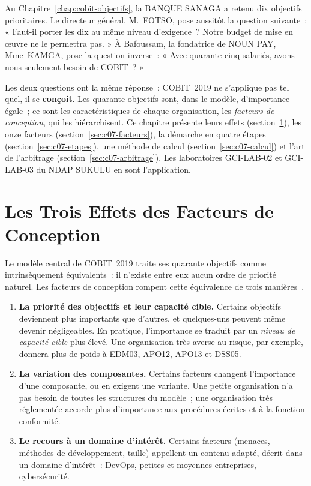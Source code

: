 Au Chapitre~\ref{chap:cobit-objectifs}, la BANQUE SANAGA a retenu dix
objectifs prioritaires. Le directeur général, M.~FOTSO, pose aussitôt la
question suivante~: « Faut-il porter les dix au même niveau d'exigence~?
Notre budget de mise en œuvre ne le permettra pas. » À Bafoussam, la
fondatrice de NOUN PAY, Mme~KAMGA, pose la question inverse~: « Avec
quarante-cinq salariés, avons-nous seulement besoin de COBIT~? »

Les deux questions ont la même réponse~: COBIT~2019 ne s'applique pas
tel quel, il se \textbf{conçoit}. Les quarante objectifs sont, dans le
modèle, d'importance égale~; ce sont les caractéristiques de chaque
organisation, les \emph{facteurs de conception}, qui les hiérarchisent.
Ce chapitre présente leurs effets (section~\ref{sec:c07-effets}), les
onze facteurs (section~\ref{sec:c07-facteurs}), la démarche en quatre
étapes (section~\ref{sec:c07-etapes}), une méthode de calcul
(section~\ref{sec:c07-calcul}) et l'art de l'arbitrage
(section~\ref{sec:c07-arbitrage}). Les laboratoires GCI-LAB-02 et GCI-LAB-03 du
NDAP SUKULU en sont l'application.

\separateur

\section{Les Trois Effets des Facteurs de Conception}
\label{sec:c07-effets}

Le modèle central de COBIT~2019 traite ses quarante objectifs comme
intrinsèquement équivalents~: il n'existe entre eux aucun ordre de priorité
naturel. Les facteurs de conception rompent cette équivalence de trois
manières~\cite{isaca2018cobitintro}.

\begin{enumerate}
    \item \textbf{La priorité des objectifs et leur capacité cible.} Certains
          objectifs deviennent plus importants que d'autres, et quelques-uns
          peuvent même devenir négligeables. En pratique, l'importance se
          traduit par un \emph{niveau de capacité cible} plus élevé. Une
          organisation très averse au risque, par exemple, donnera plus de
          poids à EDM03, APO12, APO13 et DSS05.
    \item \textbf{La variation des composantes.} Certains facteurs changent
          l'importance d'une composante, ou en exigent une variante. Une
          petite organisation n'a pas besoin de toutes les structures du
          modèle~; une organisation très réglementée accorde plus
          d'importance aux procédures écrites et à la fonction conformité.
    \item \textbf{Le recours à un domaine d'intérêt.} Certains facteurs
          (menaces, méthodes de développement, taille) appellent un contenu
          adapté, décrit dans un domaine d'intérêt~: DevOps, petites et
          moyennes entreprises, cybersécurité.
\end{enumerate}

